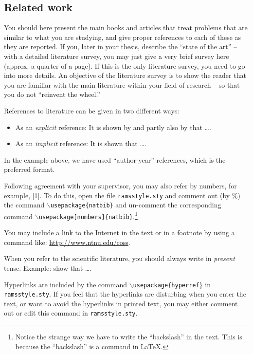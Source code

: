 \documentclass[../Main/thesis.tex]{subfiles}
\begin{document}
\subsection*{Related work}
You should here present the main books and articles that treat problems that are similar to what  you are studying, and give proper references to each of these as they are reported. 
If you,  later in your thesis, describe the ``state of the art'' -- with a detailed literature survey, you may just give a very brief survey here (approx. a quarter of a page). 
If this is the only literature survey, you need to go into more details. 
An objective of the literature survey is to show the reader that you are familiar with the main literature within your field of research -- so that you do not ``reinvent the wheel.''


References to literature can be given in two different ways:
\begin{itemize}
\item As an \emph{explicit} reference: It is shown by \citet{lundteigen08} and partly also by \citet{rausand14}  that \ldots.
\item As an \emph{implicit} reference: It is shown \citep[e.g., see][Chap. 4]{rausand04} that \ldots.
\end{itemize}
In the example above, we have used ``author-year'' references, which is the preferred format. 
\begin{remark}
Following agreement with your supervisor, you may also refer by numbers, for example,  [1]. 
To do this, open the file \texttt{ramsstyle.sty} and  comment out (by \%) the command \texttt{$\backslash$usepackage\{natbib\}} and un-comment the corresponding command \texttt{$\backslash$usepackage[numbers]\{natbib\}}.\footnote{Notice the strange way we have to write the ``backslash'' in the text. 
This is because the ``backslash'' is a command in \LaTeX.}
\end{remark}
 You may include a link to the Internet in the text or in a footnote by using a command like: \url{http://www.ntnu.edu/ross}. 

When you refer to the scientific literature, you should always write in \emph{present} tense. 
Example: \citet{rausand04} show that \ldots.

\begin{remark}
Hyperlinks are included by the command \texttt{$\backslash$usepackage\{hyperref}\} in \texttt{ramsstyle.sty}. 
If you feel that the hyperlinks are disturbing when you enter the text, or want to avoid the hyperlinks in printed text, you may either comment out or edit this command in \texttt{ramsstyle.sty}.
\end{remark}
\end{document}
